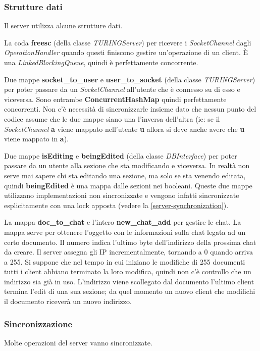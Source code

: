 \documentclass[a4paper]{article}
\theoremstyle{theorem}
\theoremstyle{remark}
\theoremstyle{definition}
\theoremstyle{corollary}
\theoremstyle{lemma}
\begin{document}
\subsubsection{Strutture dati}\label{server-data-structures}
Il server utilizza alcune strutture dati.

La coda \textbf{freesc} (della classe \textit{TURINGServer}) per ricevere i \textit{SocketChannel} dagli \textit{OperationHandler} quando questi finiscono gestire un'operazione di un client. È una \textit{LinkedBlockingQueue}, quindi è perfettamente concorrente.

Due mappe \textbf{socket\_to\_user} e \textbf{user\_to\_socket} (della classe \textit{TURINGServer}) per poter passare da un \textit{SocketChannel} all'utente che è connesso su di esso e viceversa. Sono entrambe \textbf{ConcurrentHashMap} quindi perfettamente concorrenti. Non c'è necessità di sincronizzarle insieme dato che nessun punto del codice assume che le due mappe siano una l'inversa dell'altra (ie: se il \textit{SocketChannel} \textbf{a} viene mappato nell'utente \textbf{u} allora si deve anche avere che \textbf{u} viene mappato in \textbf{a}).

Due mappe \textbf{isEditing} e \textbf{beingEdited} (della classe \textit{DBInterface}) per poter passare da un utente alla sezione che sta modificando e viceversa. In realtà non serve mai sapere chi sta editando una sezione, ma solo se sta venendo editata, quindi \textbf{beingEdited} è una mappa dalle sezioni nei booleani. Queste due mappe utilizzano implementazioni non sincronizzate e vengono infatti sincronizzate esplicitamente con una lock apposta (vedere la \autoref{server-synchronization}).

La mappa \textbf{doc\_to\_chat} e l'intero \textbf{new\_chat\_add} per gestire le chat. La mappa serve per ottenere l'oggetto con le informazioni sulla chat legata ad un certo documento. Il numero indica l'ultimo byte dell'indirizzo della prossima chat da creare. Il server assegna gli IP incrementalmente, tornando a 0 quando arriva a 255. Si suppone che nel tempo in cui iniziano le modifiche di 255 documenti tutti i client abbiano terminato la loro modifica, quindi non c'è controllo che un indirizzo sia già in uso. L'indirizzo viene scollegato dal documento l'ultimo client termina l'edit di una sua sezione; da quel momento un nuovo client che modifichi il documento riceverà un nuovo indirizzo.

\subsubsection{Sincronizzazione}\label{server-synchronization}
Molte operazioni del server vanno sincronizzate.
\end{document}
